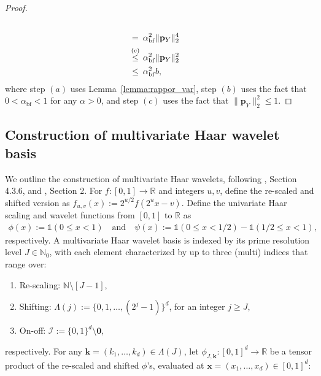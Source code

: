 \documentclass[twoside,11pt]{article}
\newcommand{\rvTwo}{Y}
\newcommand{\normSqMultinomMax}{b}
\newcommand{\dimDensity}{d} %
\newcommand{\probVec}{\mathbf{p}} %
\newcommand{\privacyParameter}{\alpha} %
\newcommand{\privacyParameterrappor}{\privacyParameter_{\mathrm{bf}}}
\newcommand{\wavFatherFunc}{\phi}
\newcommand{\wavMotherFunc}{\psi} %
\newcommand{\primResLev}{J}
\newcommand{\wavFatherUnivIndex}{k}
\newcommand{\wavFatherIndex}{\boldsymbol{\wavFatherUnivIndex}}
\begin{document}
\begin{appendix}
\begin{proof}
\begin{align*}
			\\ = \hskip 1.77mm &
			\privacyParameterrappor^2 
			\|\probVec_\rvTwo\|_2^4
			\\ \stackrel{(c)}{\leq} \hskip 1.36mm &
			\privacyParameterrappor^2
			\|\probVec_\rvTwo\|_2^2
			\\ \leq \hskip 1.72mm&
			\privacyParameterrappor^2
			\normSqMultinomMax,
		\end{align*}
		where
		step $(a)$ uses Lemma~\ref{lemma:rappor_var},
		step $(b)$ uses the fact that $0 < \privacyParameterrappor <1$ for any $\privacyParameter>0$,
		and
		step $(c)$ uses the fact that $\|\probVec_\rvTwo\|_2^2 \leq 1$.
	\end{proof}
	\subsection{Construction of multivariate Haar wavelet basis}\label{appendix:basis}
	We  outline the construction of multivariate Haar wavelets, following \citet{Gine2015Besov}, Section 4.3.6, and \citet{Autin2010Wavlet}, Section 2.
	For  $f:[0,1] \to \mathbb{R}$ and integers $u, v$, define the re-scaled and shifted version as
	$f_{u,v}(x) := 2^{u/2}f(2^u x - v)$.
	Define the univariate Haar scaling and wavelet functions from $[0,1]$ to $\mathbb{R}$ as
	\begin{align*}
		\wavFatherFunc(x)
		:=
		\mathds{1}(0 \leq x < 1)
		\quad
		\text{and}
		\quad
		\wavMotherFunc(x)
		:=
		\mathds{1}(0 \leq x < 1/2) - \mathds{1}(1/2\leq x < 1),
	\end{align*}
	respectively.
	A multivariate Haar wavelet basis is indexed by its prime resolution level $\primResLev \in \mathbb{N}_0$, with each element characterized by up to three (multi) indices that range over:
	\begin{enumerate}
		\item Re-scaling: $\mathbb{N} \setminus [\primResLev-1]$,
		\item Shifting: $\Lambda(j) := \{0, 1, \ldots, (2^j - 1)\}^\dimDensity$, for an  integer $j \geq \primResLev$,
		\item On-off: $\mathcal{I} := \{0, 1\}^\dimDensity \setminus \mathbf{0}$,
	\end{enumerate}
	respectively.
	For any $\wavFatherIndex = (k_1, \ldots, k_\dimDensity) \in \Lambda(\primResLev)$, let $\wavFatherFunc_{\primResLev, \wavFatherIndex} : [0,1]^\dimDensity \to \mathbb{R}$ be a tensor product of the re-scaled and shifted $\wavFatherFunc$'s, evaluated at $\mathbf{x} = (x_1, \ldots, x_\dimDensity) \in [0,1]^\dimDensity$:

\end{appendix}
\end{document}
